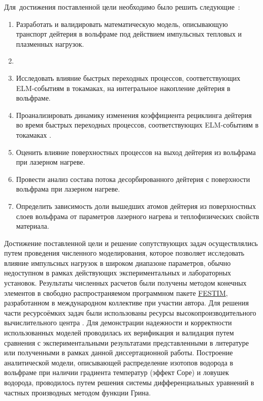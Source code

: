 Для~достижения поставленной цели необходимо было решить следующие~{\tasks}:
\begin{enumerate}[beginpenalty=10000] %
    \item Разработать и валидировать математическую модель, описывающую транспорт дейтерия в вольфраме под действием импульсных тепловых и плазменных нагрузок.
    \item {}
    \item Исследовать влияние быстрых переходных процессов, соответствующих ELM-событиям в токамаках, на интегральное накопление дейтерия в вольфраме.
    \item Проанализировать динамику изменения коэффициента рециклинга дейтерия во время быстрых переходных процессов, соответствующих ELM-событиям в токамаках .
    \item Оценить влияние поверхностных процессов на выход дейтерия из вольфрама при лазерном нагреве.
    \item Провести анализ состава потока десорбированного дейтерия с поверхности вольфрама при лазерном нагреве.
    \item Определить зависимость доли вышедших атомов дейтерия из поверхностных слоев вольфрама от параметров лазерного нагрева и теплофизических свойств материала.
\end{enumerate}

{\methods} Достижение поставленной цели и решение сопутствующих задач осуществлялись путем проведения численного моделирования, которое позволяет исследовать влияние импульсных нагрузок в широком диапазоне параметров, обычно недоступном в рамках действующих экспериментальных и лабораторных установок. Результаты численных расчетов были получены методом конечных элементов в свободно распространяемом программном пакете \href{https://github.com/festim-dev/FESTIM}{FESTIM}, разработанном в международном коллективе при участии автора. Для решения части ресурсоёмких задач были использованы ресурсы высокопроизводительного вычислительного центра \thesisOrganizationShort. Для демонстрации надежности и корректности использованных моделей проводилась их верификация и валидация путем сравнения с экспериментальными результатами представленными в литературе или полученными в рамках данной диссертационной работы. Построение аналитической модели, описывающей распределение изотопов водорода в вольфраме при наличии градиента температур (эффект Соре) и ловушек водорода, проводилось путем решения системы дифференциальных уравнений в частных производных методом функции Грина.

